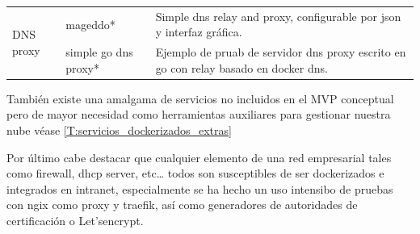 \begin{center}
\begin{longtable}[!ht]{|p{3cm}|p{4cm}|p{6cm}|}
 \multirow{2}{4em}{DNS proxy} & mageddo\cite{c_mageddo}* &  Simple dns relay and proxy, configurable por json y interfaz gráfica.\\ \cline{2-3} 
 & simple go dns proxy\cite{c_dns_proxy_carlsverre}* &  Ejemplo de pruab de servidor dns proxy escrito en go con relay basado en docker dns.\\ \hline

\end{longtable}
\end{center}


También existe una amalgama de servicios no incluidos en el MVP conceptual pero de mayor necesidad como herramientas auxiliares para gestionar nuestra nube véase \ref{T:servicios_dockerizados_extras}

\begin{table}[!ht]
\caption{Tabla servicios dockerizados Extras.}  
\label{T:servicios_dockerizados_extras}
\end{table}

Por último cabe destacar que cualquier elemento de una red empresarial tales como firewall, dhcp server, etc… todos son susceptibles de ser dockerizados e integrados en intranet, especialmente se ha hecho un uso intensibo de pruebas con ngix\cite{c_ngix} como proxy y traefik\cite{c_traefik}, así como generadores de autoridades de certificación o Let'sencrypt\cite{c_letsencrypt}.


